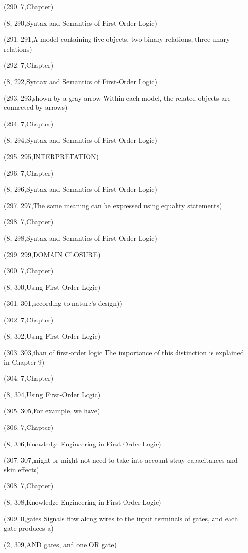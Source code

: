 (290, 7,Chapter)

(8, 290,Syntax and Semantics of First-Order Logic)

(291, 291,A model containing ﬁve objects, two binary relations, three unary relations)

(292, 7,Chapter)

(8, 292,Syntax and Semantics of First-Order Logic)

(293, 293,shown by a gray arrow Within each model, the related objects are connected by arrows)

(294, 7,Chapter)

(8, 294,Syntax and Semantics of First-Order Logic)

(295, 295,INTERPRETATION)

(296, 7,Chapter)

(8, 296,Syntax and Semantics of First-Order Logic)

(297, 297,The same meaning can be expressed using equality statements)

(298, 7,Chapter)

(8, 298,Syntax and Semantics of First-Order Logic)

(299, 299,DOMAIN CLOSURE)

(300, 7,Chapter)

(8, 300,Using First-Order Logic)

(301, 301,according to nature’s design))

(302, 7,Chapter)

(8, 302,Using First-Order Logic)

(303, 303,than of ﬁrst-order logic The importance of this distinction is explained in Chapter 9)

(304, 7,Chapter)

(8, 304,Using First-Order Logic)

(305, 305,For example, we have)

(306, 7,Chapter)

(8, 306,Knowledge Engineering in First-Order Logic)

(307, 307,might or might not need to take into account stray capacitances and skin effects)

(308, 7,Chapter)

(8, 308,Knowledge Engineering in First-Order Logic)

(309, 0,gates Signals ﬂow along wires to the input terminals of gates, and each gate produces a)

(2, 309,AND gates, and one OR gate)

